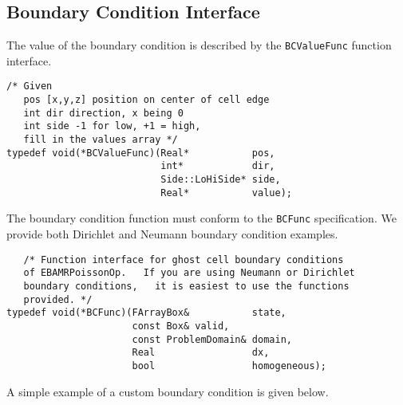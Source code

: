 \subsection{Boundary Condition Interface}
\label{sec::AMRPBC}
The value of the boundary
condition is described by the {\tt BCValueFunc} function interface.
\begin{scriptsize}
\begin{verbatim}
/* Given
   pos [x,y,z] position on center of cell edge
   int dir direction, x being 0
   int side -1 for low, +1 = high,
   fill in the values array */
typedef void(*BCValueFunc)(Real*           pos,
                           int*            dir,
                           Side::LoHiSide* side,
                           Real*           value);
\end{verbatim}
\end{scriptsize}
The boundary condition function must conform to the {\tt BCFunc}
specification. We provide both Dirichlet and Neumann boundary
condition examples.
\begin{scriptsize}
\begin{verbatim}
   /* Function interface for ghost cell boundary conditions
   of EBAMRPoissonOp.   If you are using Neumann or Dirichlet 
   boundary conditions,   it is easiest to use the functions 
   provided. */
typedef void(*BCFunc)(FArrayBox&           state,
                      const Box& valid,
                      const ProblemDomain& domain,
                      Real                 dx,
                      bool                 homogeneous);
\end{verbatim}
\end{scriptsize}
A simple example of a custom boundary condition is given below.
